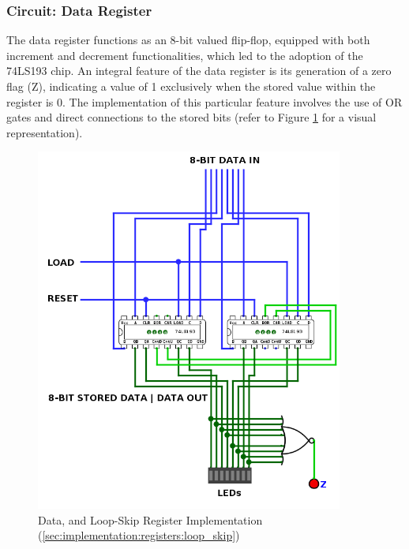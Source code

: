 \subsubsection{Circuit: Data Register}
The data register functions as an 8-bit valued flip-flop, equipped with both increment and decrement functionalities, which led to the adoption of the 74LS193 chip. An integral feature of the data register is its generation of a zero flag (Z), indicating a value of 1 exclusively when the stored value within the register is 0. The implementation of this particular feature involves the use of OR gates and direct connections to the stored bits (refer to Figure \ref{fig:dataRegisterImplementation} for a visual representation).


\begin{figure}[H]
	\centering
	\includegraphics[width=0.9\textwidth]{img/data_register_implementation}
	\caption{Data, and Loop-Skip Register Implementation (\ref{sec:implementation:registers:loop_skip})}
	\label{fig:dataRegisterImplementation}
\end{figure}


